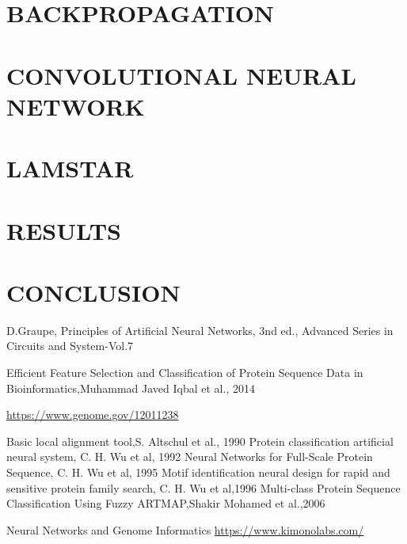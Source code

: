 \documentclass[a4paper, 10pt, conference]{ieeeconf}      %
\begin{document}
\section{BACKPROPAGATION}\label{sec:bp}
\section{CONVOLUTIONAL NEURAL NETWORK}\label{sec:cnn}
\section{LAMSTAR}\label{sec:lamstar}
\section{RESULTS}\label{sec:results}
\section{CONCLUSION}\label{sec:conclusion}

\clearpage
\newpage
\begin{thebibliography}{99}

D.Graupe, Principles of Artificial Neural Networks, 3nd ed., Advanced Series in Circuits and System-Vol.7

Efficient Feature Selection and Classification of Protein Sequence Data in Bioinformatics,Muhammad Javed Iqbal et al., 2014

\href{https://www.genome.gov/12011238}{https://www.genome.gov/12011238}

Basic local alignment tool,S. Altschul et al., 1990
Protein classification artificial neural system, C. H. Wu et al, 1992
Neural Networks for Full-Scale Protein Sequence, C. H. Wu et al, 1995
Motif identification neural design for rapid and sensitive protein family search, C. H. Wu et al,1996
Multi-class Protein Sequence Classification Using Fuzzy ARTMAP,Shakir Mohamed et al.,2006

Neural Networks and Genome Informatics
\href{https://www.kimonolabs.com/}{https://www.kimonolabs.com/}
\end{thebibliography}
\end{document}
